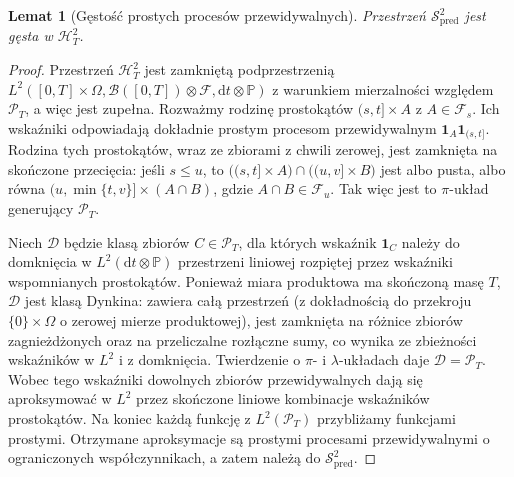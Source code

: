 \documentclass[11pt,a4paper,oneside]{report}
\numberwithin{equation}{chapter}
\theoremstyle{plain}
\newtheorem{lemat}[twierdzenie]{Lemat}
\theoremstyle{definition}
\theoremstyle{remark}
\newcommand{\Prob}{\mathbb{P}}
\newcommand{\calF}{\mathcal{F}}
\newcommand{\calH}{\mathcal{H}}
\newcommand{\calB}{\mathcal{B}}
\newcommand{\calP}{\mathcal{P}}
\newcommand{\calD}{\mathcal{D}}
\newcommand{\calS}{\mathcal{S}}
\newcommand{\ind}[1]{\mathbf{1}_{#1}}
\newcommand{\dd}{\mathrm{d}}
\begin{document}
\begin{lemat}[Gęstość prostych procesów przewidywalnych]
\label{lem:pred-dense}
Przestrzeń $\calS_{\mathrm{pred}}^2$ jest gęsta w
$\calH_T^2$.
\end{lemat}
\begin{proof}
Przestrzeń $\calH_T^2$ jest zamkniętą podprzestrzenią
$L^2([0,T]\times\Omega,\calB([0,T])\otimes\calF,
\dd t\otimes\Prob)$ z warunkiem mierzalności względem
$\calP_T$, a więc jest zupełna.
Rozważmy rodzinę prostokątów $(s,t]\times A$ z
$A\in\calF_s$. Ich wskaźniki odpowiadają dokładnie
prostym procesom przewidywalnym
$\ind A\ind{(s,t]}$. Rodzina tych prostokątów, wraz
ze zbiorami z chwili zerowej, jest zamknięta na
skończone przecięcia: jeśli $s\le u$, to
$\big((s,t]\times A\big)\cap\big((u,v]\times B\big)$
jest albo pusta, albo równa
$(u,\min\{t,v\}]\times(A\cap B)$, gdzie
$A\cap B\in\calF_u$. Tak więc jest to $\pi$-układ
generujący $\calP_T$.

Niech $\calD$ będzie klasą zbiorów $C\in\calP_T$,
dla których wskaźnik $\ind C$ należy do domknięcia
w $L^2(\dd t\otimes\Prob)$ przestrzeni liniowej
rozpiętej przez wskaźniki wspomnianych prostokątów.
Ponieważ miara produktowa ma skończoną masę $T$,
$\calD$ jest klasą Dynkina: zawiera całą przestrzeń
(z dokładnością do przekroju $\{0\}\times\Omega$ o
zerowej mierze produktowej), jest zamknięta na różnice
zbiorów zagnieżdżonych oraz na przeliczalne rozłączne
sumy, co wynika ze zbieżności wskaźników w $L^2$
i z domknięcia. Twierdzenie o $\pi$- i $\lambda$-układach
daje $\calD=\calP_T$. Wobec tego wskaźniki dowolnych
zbiorów przewidywalnych dają się aproksymować w $L^2$
przez skończone liniowe kombinacje wskaźników prostokątów.
Na koniec każdą funkcję z $L^2(\calP_T)$ przybliżamy
funkcjami prostymi. Otrzymane aproksymacje są
prostymi procesami przewidywalnymi o ograniczonych
współczynnikach, a zatem należą do
$\calS_{\mathrm{pred}}^2$.
\end{proof}
\end{document}
